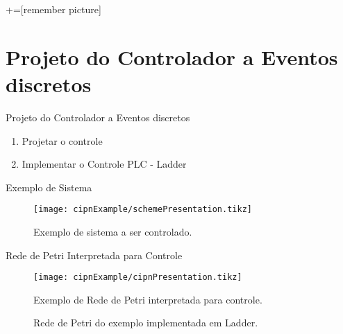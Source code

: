 
+=[remember picture]
\section{Projeto do Controlador a Eventos discretos}

\begin{frame}{Projeto do Controlador a Eventos discretos}
  \begin{enumerate}
   \item Projetar o controle\pause 
   \item Implementar o Controle \pause PLC - Ladder
\end{enumerate}
\end{frame}

\begin{frame}{Exemplo de Sistema}
\begin{figure}[H]
  \centering
  \texttt{[image: cipnExample/schemePresentation.tikz]}
  \caption{Exemplo de sistema a ser controlado.}
  \label{fig:cipnexamplescheme}
\end{figure}
\end{frame}


\begin{frame}{Rede de Petri Interpretada para Controle}
\begin{figure}[H]
  \centering \texttt{[image: cipnExample/cipnPresentation.tikz]}
  \caption{Exemplo de Rede de Petri interpretada para controle.}
  \label{fig:cipnexample}
\end{figure}
\end{frame}

\begin{frame}
  \begin{figure}[H]
    \centering
 \caption{Rede de Petri do exemplo implementada em Ladder.}
  \label{fig:cipnexampleLadder}
\end{figure}
\end{frame}

